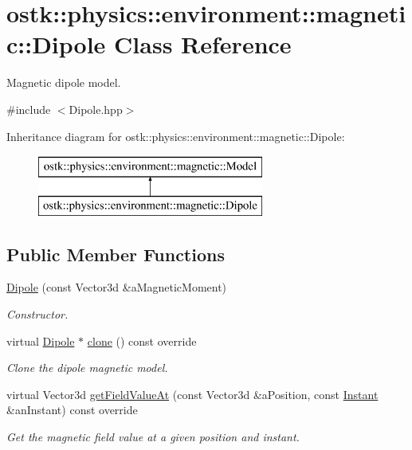 \hypertarget{classostk_1_1physics_1_1environment_1_1magnetic_1_1_dipole}{}\section{ostk\+:\+:physics\+:\+:environment\+:\+:magnetic\+:\+:Dipole Class Reference}
\label{classostk_1_1physics_1_1environment_1_1magnetic_1_1_dipole}


Magnetic dipole model.  




{\ttfamily \#include $<$Dipole.\+hpp$>$}

Inheritance diagram for ostk\+:\+:physics\+:\+:environment\+:\+:magnetic\+:\+:Dipole\+:\begin{figure}[H]
\begin{center}
\leavevmode
\includegraphics[height=2.000000cm]{classostk_1_1physics_1_1environment_1_1magnetic_1_1_dipole}
\end{center}
\end{figure}
\subsection*{Public Member Functions}
\begin{DoxyCompactItemize}
\item 
\hyperlink{classostk_1_1physics_1_1environment_1_1magnetic_1_1_dipole_a974e9a8c1062516d6c872b96d5573779}{Dipole} (const Vector3d \&a\+Magnetic\+Moment)
\begin{DoxyCompactList}\small\item\em Constructor. \end{DoxyCompactList}\item 
virtual \hyperlink{classostk_1_1physics_1_1environment_1_1magnetic_1_1_dipole}{Dipole} $\ast$ \hyperlink{classostk_1_1physics_1_1environment_1_1magnetic_1_1_dipole_ad4255ff1007a339c9f0bdbda321c0ab2}{clone} () const override
\begin{DoxyCompactList}\small\item\em Clone the dipole magnetic model. \end{DoxyCompactList}\item 
virtual Vector3d \hyperlink{classostk_1_1physics_1_1environment_1_1magnetic_1_1_dipole_ae2c65e41445c91b3efec455fb5077ab1}{get\+Field\+Value\+At} (const Vector3d \&a\+Position, const \hyperlink{classostk_1_1physics_1_1time_1_1_instant}{Instant} \&an\+Instant) const override
\begin{DoxyCompactList}\small\item\em Get the magnetic field value at a given position and instant. \end{DoxyCompactList}\end{DoxyCompactItemize}


